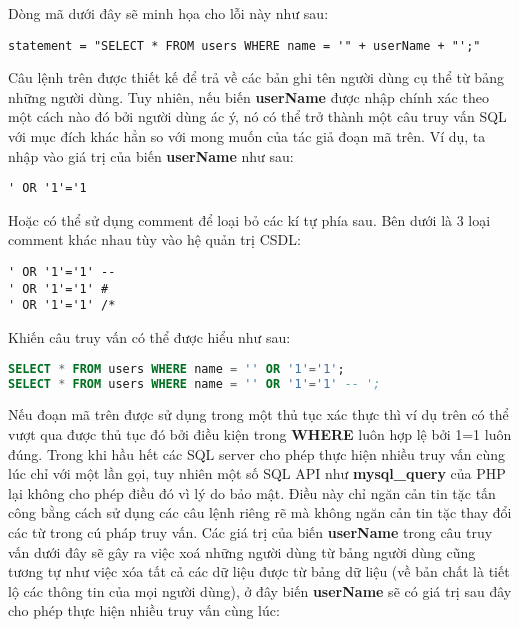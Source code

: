 \documentclass[../main-report.tex]{subfiles}
\begin{document}
\begin{example}
Dòng mã dưới đây sẽ minh họa cho lỗi này như sau:

\begin{lstlisting}
statement = "SELECT * FROM users WHERE name = '" + userName + "';"
\end{lstlisting}
\end{example}

Câu lệnh trên được thiết kế để trả về các bản ghi tên người dùng cụ thể từ bảng những người dùng. Tuy nhiên, nếu biến \textbf{userName} được nhập chính xác theo một cách nào đó bởi người dùng ác ý, nó có thể trở thành một câu truy vấn SQL với mục đích khác hẳn so với mong muốn của tác giả đoạn mã trên. Ví dụ, ta nhập vào giá trị của biến \textbf{userName} như sau:

\begin{lstlisting}
' OR '1'='1
\end{lstlisting}

Hoặc có thể sử dụng comment để loại bỏ các kí tự phía sau. Bên dưới là 3 loại comment khác nhau tùy vào hệ quản trị CSDL:

\begin{lstlisting}
' OR '1'='1' --
' OR '1'='1' #
' OR '1'='1' /*
\end{lstlisting}

Khiến câu truy vấn có thể được hiểu như sau:

\begin{lstlisting}[language=SQL]
SELECT * FROM users WHERE name = '' OR '1'='1';
SELECT * FROM users WHERE name = '' OR '1'='1' -- ';
\end{lstlisting}

Nếu đoạn mã trên được sử dụng trong một thủ tục xác thực thì ví dụ trên có thể vượt qua được thủ tục đó bởi điều kiện trong \textbf{WHERE} luôn hợp lệ bởi 1=1 luôn đúng. Trong khi hầu hết các SQL server cho phép thực hiện nhiều truy vấn cùng lúc chỉ với một lần gọi, tuy nhiên một số SQL API như \textbf{mysql\_query} của PHP lại không cho phép điều đó vì lý do bảo mật. Điều này chỉ ngăn cản tin tặc tấn công bằng cách sử dụng các câu lệnh riêng rẽ mà không ngăn cản tin tặc thay đổi các từ trong cú pháp truy vấn. Các giá trị của biến \textbf{userName} trong câu truy vấn dưới đây sẽ gây ra việc xoá những người dùng từ bảng người dùng cũng tương tự như việc xóa tất cả các dữ liệu được từ bảng dữ liệu (về bản chất là tiết lộ các thông tin của mọi người dùng), ở đây biến \textbf{userName} sẽ có giá trị sau đây cho phép thực hiện nhiều truy vấn cùng lúc:
\end{document}
